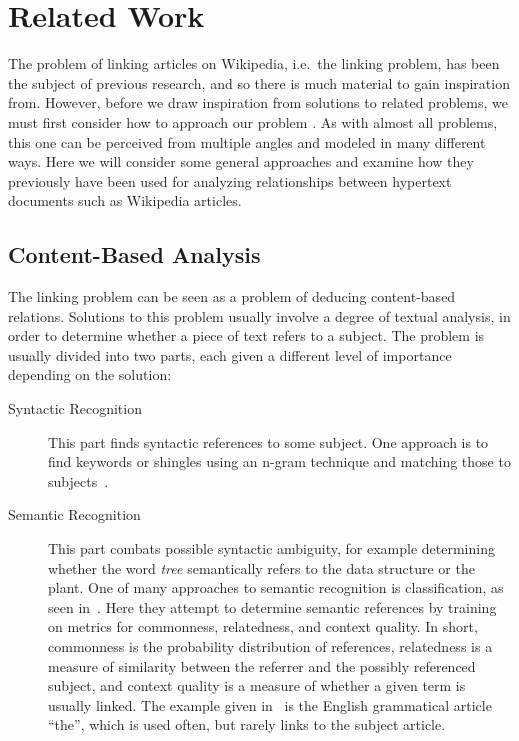 \section{Related Work}\label{sec:related_work}
The problem of linking articles on Wikipedia, i.e.\ the linking problem, has been the subject of previous research, and so there is much material to gain inspiration from. However, before we draw inspiration from solutions to related problems, we must first consider how to approach our problem . As with almost all problems, this one can be perceived from multiple angles and modeled in many different ways. Here we will consider some general approaches and examine how they previously have been used for analyzing relationships between hypertext documents such as Wikipedia articles.

\subsection{Content-Based Analysis}\label{related_semantic_contextual}
The linking problem can be seen as a problem of deducing content-based relations. Solutions to this problem usually involve a degree of textual analysis, in order to determine whether a piece of text refers to a subject. The problem is usually divided into two parts, each given a different level of importance depending on the solution:

\begin{description}
  \item[Syntactic Recognition] This part finds syntactic references to some subject. One approach is to find keywords or shingles using an n-gram technique and matching those to subjects~\cite{mihalcea2007wikify}.

  \item[Semantic Recognition] This part combats possible syntactic ambiguity, for example determining whether the word \emph{tree} semantically refers to the data structure or the plant. One of many approaches to semantic recognition is classification, as seen in~\cite{milne2008learning}. Here they attempt to determine semantic references by training on metrics for commonness, relatedness, and context quality. In short, commonness is the probability distribution of references, relatedness is a measure of similarity between the referrer and the possibly referenced subject, and context quality is a measure of whether a given term is usually linked. The example given in~\cite{milne2008learning} is the English grammatical article \enquote{the}, which is used often, but rarely links to the subject article.
\end{description}

